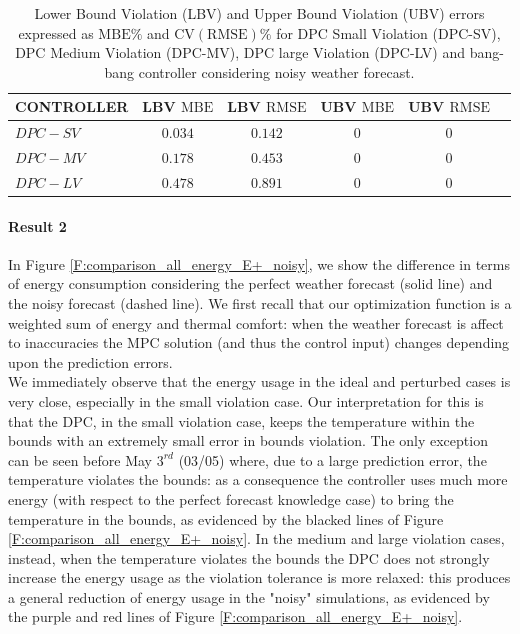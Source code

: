 \begin{table}[t!]
	\centering
	\textcolor[rgb]{0,0,1}{\begin{tabular}{lccccc}
		\toprule
		CONTROLLER  & LBV $\mathrm{MBE}$  & LBV $\mathrm{RMSE}$ & UBV $\mathrm{MBE}$ & UBV $\mathrm{RMSE}$ 	\\ 
		\midrule
		$DPC-SV$    & $0.034$             & $0.142$  			      & $0$    				 & $0$     	  	\\
		$DPC-MV$    & $0.178$ 			  & $0.453$       			  & $0$    				 & $0$		  	\\
		$DPC-LV$    & $0.478$  			  & $0.891$     			  & $0$    				 & $0$	      	\\
		\bottomrule
	\end{tabular}}
	\caption{\textcolor[rgb]{0,0,1}{Lower Bound Violation (LBV) and Upper Bound Violation (UBV) errors expressed as $\mathrm{MBE}\%$ and $\mathrm{CV(RMSE)}\%$ for DPC Small Violation (DPC-SV), DPC Medium Violation (DPC-MV), DPC large Violation (DPC-LV) and bang-bang controller considering noisy weather forecast.}}
	\captionsetup{justification=centering}
	\label{T:violationErrorsNoisy}
\end{table}


\textcolor[rgb]{0,0,1}{\paragraph{Result 2} 
In Figure \ref{F:comparison_all_energy_E+_noisy}, we show the difference in terms of energy consumption considering the perfect weather forecast (solid line) and the noisy forecast (dashed line). We first recall that our optimization function is a weighted sum of energy and thermal comfort: when the weather forecast is affect to inaccuracies the MPC solution (and thus the control input) changes depending upon the prediction errors.\\
We immediately observe that the energy usage in the ideal and perturbed cases is very close, especially in the small violation case. Our interpretation for this is that the DPC, in the small violation case, keeps the temperature within the bounds with an extremely small error in bounds violation. The only exception can be seen before May $3^{rd}$ (03/05) where, due to a large prediction error, the temperature violates the bounds: as a consequence the controller uses much more energy (with respect to the perfect forecast knowledge case) to bring the temperature in the bounds, as evidenced by the blacked lines of Figure \ref{F:comparison_all_energy_E+_noisy}. In the medium and large violation cases, instead, when the temperature violates the bounds the DPC does not strongly increase the energy usage as the violation tolerance is more relaxed: this produces a general reduction of energy usage in the "noisy" simulations, as evidenced by the purple and red lines of Figure \ref{F:comparison_all_energy_E+_noisy}.
}

